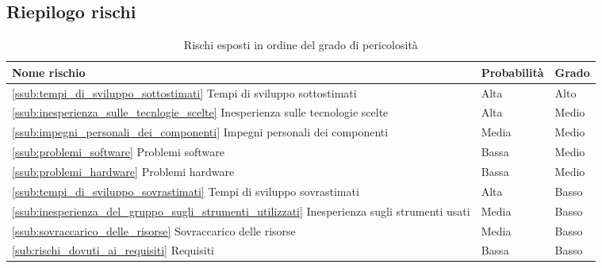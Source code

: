 	\subsection{Riepilogo rischi} %
	\label{sub:riepilogo_rischi}
		\begin{table}[!h]
			\begin{center}
				\begin{tabularx}{0.9\textwidth}{|l|l|X|}
					\hline
					\textbf{Nome rischio} & \textbf{Probabilità} & \textbf{Grado} \\
					\hline
					\ref{ssub:tempi_di_sviluppo_sottostimati} Tempi di sviluppo sottostimati &
					Alta &
					Alto \\
					\hline
					\ref{ssub:inesperienza_sulle_tecnlogie_scelte} Inesperienza sulle tecnologie scelte &
					Alta &
					Medio \\
					\hline
					\ref{ssub:impegni_personali_dei_componenti} Impegni personali dei componenti &
					Media &
					Medio \\
					\hline
					\ref{ssub:problemi_software} Problemi software &
					Bassa &
					Medio \\
					\hline
					\ref{ssub:problemi_hardware} Problemi hardware &
					Bassa &
					Medio \\
					\hline
					\ref{ssub:tempi_di_sviluppo_sovrastimati}  Tempi di sviluppo sovrastimati &
					Alta &
					Basso \\
					\hline
					\ref{ssub:inesperienza_del_gruppo_sugli_strumenti_utilizzati} Inesperienza sugli strumenti usati &
					Media &
					Basso \\
					\hline
					\ref{ssub:sovraccarico_delle_risorse} Sovraccarico delle risorse &
					Media &
					Basso \\
					\hline
					\ref{sub:rischi_dovuti_ai_requisiti} Requisiti &
					Bassa &
					Basso \\
					\hline	
				\end{tabularx}
			\end{center}
		\caption{Rischi esposti in ordine del grado di pericolosità}
		\end{table}
		
	
